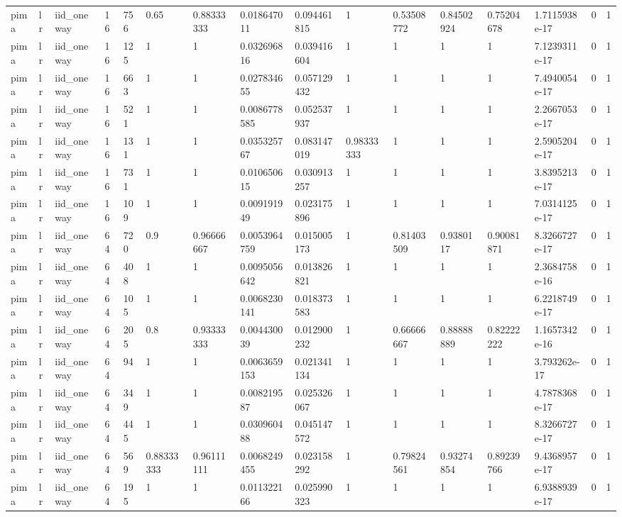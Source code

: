 \begin{tabular}{llllllllllllllll}
pima & lr & iid\_oneway & 16 & 756 & 0.65 & 0.88333333 & 0.018647011 & 0.094461815 & 1 & 0.53508772 & 0.84502924 & 0.75204678 & 1.7115938e-17 & 0 & 1 \\
pima & lr & iid\_oneway & 16 & 125 & 1 & 1 & 0.032696816 & 0.039416604 & 1 & 1 & 1 & 1 & 7.1239311e-17 & 0 & 1 \\
pima & lr & iid\_oneway & 16 & 663 & 1 & 1 & 0.027834655 & 0.057129432 & 1 & 1 & 1 & 1 & 7.4940054e-17 & 0 & 1 \\
pima & lr & iid\_oneway & 16 & 521 & 1 & 1 & 0.0086778585 & 0.052537937 & 1 & 1 & 1 & 1 & 2.2667053e-17 & 0 & 1 \\
pima & lr & iid\_oneway & 16 & 131 & 1 & 1 & 0.035325767 & 0.083147019 & 0.98333333 & 1 & 1 & 1 & 2.5905204e-17 & 0 & 1 \\
pima & lr & iid\_oneway & 16 & 731 & 1 & 1 & 0.010650615 & 0.030913257 & 1 & 1 & 1 & 1 & 3.8395213e-17 & 0 & 1 \\
pima & lr & iid\_oneway & 16 & 109 & 1 & 1 & 0.009191949 & 0.023175896 & 1 & 1 & 1 & 1 & 7.0314125e-17 & 0 & 1 \\
pima & lr & iid\_oneway & 64 & 720 & 0.9 & 0.96666667 & 0.0053964759 & 0.015005173 & 1 & 0.81403509 & 0.9380117 & 0.90081871 & 8.3266727e-17 & 0 & 1 \\
pima & lr & iid\_oneway & 64 & 408 & 1 & 1 & 0.0095056642 & 0.013826821 & 1 & 1 & 1 & 1 & 2.3684758e-16 & 0 & 1 \\
pima & lr & iid\_oneway & 64 & 105 & 1 & 1 & 0.0068230141 & 0.018373583 & 1 & 1 & 1 & 1 & 6.2218749e-17 & 0 & 1 \\
pima & lr & iid\_oneway & 64 & 205 & 0.8 & 0.93333333 & 0.004430039 & 0.012900232 & 1 & 0.66666667 & 0.88888889 & 0.82222222 & 1.1657342e-16 & 0 & 1 \\
pima & lr & iid\_oneway & 64 & 94 & 1 & 1 & 0.0063659153 & 0.021341134 & 1 & 1 & 1 & 1 & 3.793262e-17 & 0 & 1 \\
pima & lr & iid\_oneway & 64 & 349 & 1 & 1 & 0.008219587 & 0.025326067 & 1 & 1 & 1 & 1 & 4.7878368e-17 & 0 & 1 \\
pima & lr & iid\_oneway & 64 & 445 & 1 & 1 & 0.030960488 & 0.045147572 & 1 & 1 & 1 & 1 & 8.3266727e-17 & 0 & 1 \\
pima & lr & iid\_oneway & 64 & 569 & 0.88333333 & 0.96111111 & 0.0068249455 & 0.023158292 & 1 & 0.79824561 & 0.93274854 & 0.89239766 & 9.4368957e-17 & 0 & 1 \\
pima & lr & iid\_oneway & 64 & 195 & 1 & 1 & 0.011322166 & 0.025990323 & 1 & 1 & 1 & 1 & 6.9388939e-17 & 0 & 1 \\

\end{tabular}
